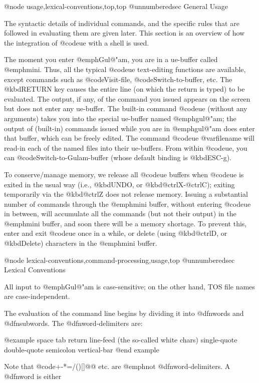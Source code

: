 @node usage,lexical-conventions,top,top
@unnumberedsec General Usage

The syntactic details of individual commands, and the specific rules that
are followed in evaluating them are given later.  This section is an
overview of how the integration of @code{ue} with a shell is used.

The moment you enter @emph{Gul@"am}, you are in a ue-buffer
called @emph{mini}.  Thus, all the typical @code{ue} text-editing
functions are available, except commands such as @code{Visit-file},
@code{Switch-to-buffer}, etc.  The @kbd{RETURN} key causes the entire
line (on which the return is typed) to be evaluated.  The output, if
any, of the command you issued appears on the screen but does not
enter any ue-buffer.  The built-in command @code{ue} (without any
arguments) takes you into the special ue-buffer named @emph{gul@"am};
the output of (built-in) commands issued while you are in @emph{gul@"am}
does enter that buffer, which can be freely edited.  The command
@code{ue} @var{filename} will read-in each of the named files into
their ue-buffers.  From within @code{ue}, you can
@code{Switch-to-Gulam-buffer} (whose default binding is @kbd{ESC-g}).

To conserve/manage memory, we release all @code{ue} buffers when @code{ue}
is exited in the usual way (i.e., @kbd{UNDO}, or @kbd{@ctrl{X}-@ctrl{C}});
exiting temporarily via the @kbd{@ctrl{Z}} does not release memory.
Issuing a substantial number of commands through the @emph{mini} buffer,
without entering @code{ue} in between, will accumulate all the commands
(but not their output) in the @emph{mini} buffer, and soon there will be a
memory shortage.  To prevent this, enter and exit @code{ue} once in a
while, or delete (using @kbd{@ctrl{D}}, or @kbd{Delete}) characters in the
@emph{mini} buffer.



@node lexical-conventions,command-processing,usage,top
@unnumberedsec Lexical Conventions

All  input  to  @emph{Gul@"am}  is  case-sensitive; on the other hand, TOS
file names are case-independent.  

The  evaluation  of  the command line  begins by dividing it into
@dfn{words} and @dfn{subwords}.  The @dfn{word-delimiters} are: 

@example
space   tab     return  line-feed       (the so-called white chars)
single-quote    double-quote
semicolon       vertical-bar
@end example

Note that  @code{+-*=/()[]@{@}} etc. are @emph{not} @dfn{word-delimiters}.  A
@dfn{word}  is  either

